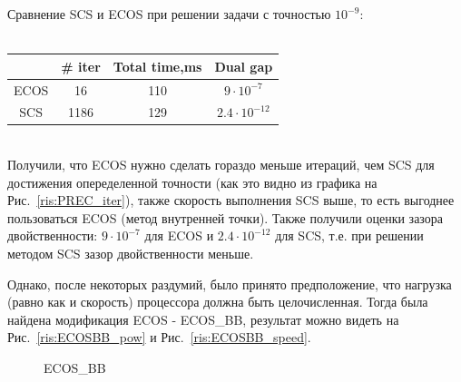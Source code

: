 \documentclass{article}
\begin{document}
Сравнение SCS и ECOS при решении задачи с точностью $10^{-9}$:\\
\\
\begin{center}
\begin{tabular}{c|c|c|c}
     &  # iter & Total time,ms & Dual gap \\
     \hline
     ECOS & 16 &110 & $9\cdot{10^{-7}}$ \\
     \hline
     SCS & 1186 & 129& $2.4\cdot{10^{-12}}$ \\
\end{tabular}
\end{center}\\

Получили, что ECOS нужно сделать гораздо меньше итераций, чем SCS для достижения опеределенной точности (как это видно из графика на Рис.~\ref{ris:PREC_iter}), также скорость выполнения SCS выше, то есть выгоднее пользоваться ECOS (метод внутренней точки). Также получили оценки зазора двойственности: $9\cdot{10^{-7}}$ для ECOS и $2.4\cdot{10^{-12}}$ для SCS, т.е. при решении методом SCS зазор двойственности меньше. 

Однако, после некоторых раздумий, было принято предположение, что нагрузка (равно как и скорость) процессора должна быть целочисленная. Тогда была найдена модификация ECOS - ECOS\_BB, результат можно видеть на Рис.~\ref{ris:ECOSBB_pow} и Рис.~\ref{ris:ECOSBB_speed}.

\begin{figure}[h]
\caption{ECOS\_BB}
\end{figure}
\end{document}
